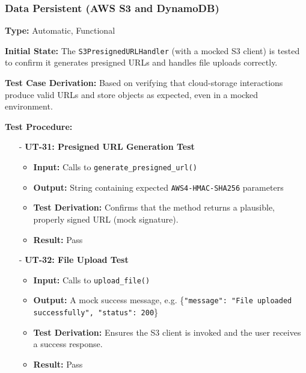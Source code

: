 \documentclass[12pt, titlepage]{article}
\begin{document}
\subsubsection{Data Persistent (AWS S3 and DynamoDB)}
\textbf{Type:} Automatic, Functional
\vspace{10pt}

\noindent \textbf{Initial State:}
The \texttt{S3PresignedURLHandler} (with a mocked S3 client) is tested to confirm it generates presigned URLs and handles file uploads correctly.
\vspace{10pt}

\noindent \textbf{Test Case Derivation:}
Based on verifying that cloud-storage interactions produce valid URLs and store objects as expected, even in a mocked environment.
\vspace{10pt}

\noindent \textbf{Test Procedure:}
\begin{itemize}
    \item[-] \textbf{UT-31: Presigned URL Generation Test} \label{test:s3-presigned-url}
    \begin{itemize}
        \item \textbf{Input:} Calls to \texttt{generate\_presigned\_url()}
        \item \textbf{Output:} String containing expected \texttt{AWS4-HMAC-SHA256} parameters
        \item \textbf{Test Derivation:} Confirms that the method returns a plausible, properly signed URL (mock signature).
        \item \textbf{Result:} Pass
    \end{itemize}

    \item[-] \textbf{UT-32: File Upload Test} \label{test:s3-file-upload}
    \begin{itemize}
        \item \textbf{Input:} Calls to \texttt{upload\_file()}
        \item \textbf{Output:} A mock success message, e.g. \{\texttt{"message": "File uploaded successfully", "status": 200}\}
        \item \textbf{Test Derivation:} Ensures the S3 client is invoked and the user receives a success response.
        \item \textbf{Result:} Pass
    \end{itemize}
\end{itemize}
\vspace{10pt}
\end{document}
